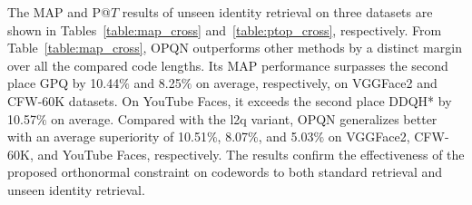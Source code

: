 \documentclass{elsarticle}
\begin{document}
The MAP and P@$T$ results of unseen identity retrieval on three datasets are shown in Tables~\ref{table:map_cross} and~\ref{table:ptop_cross}, respectively. From Table~\ref{table:map_cross}, OPQN outperforms other methods by a distinct margin over all the compared code lengths. Its MAP performance surpasses the second place GPQ by 10.44$\%$ and 8.25$\%$ on average, respectively, on VGGFace2 and CFW-60K datasets. On YouTube Faces, it exceeds the second place DDQH* by 10.57$\%$ on average. Compared with the l2q variant, OPQN generalizes better with an average superiority of 10.51$\%$, 8.07$\%$, and 5.03$\%$ on VGGFace2, CFW-60K, and YouTube Faces, respectively. The results confirm the effectiveness of the proposed orthonormal constraint on codewords to both standard retrieval and unseen identity retrieval. 
\end{document}

